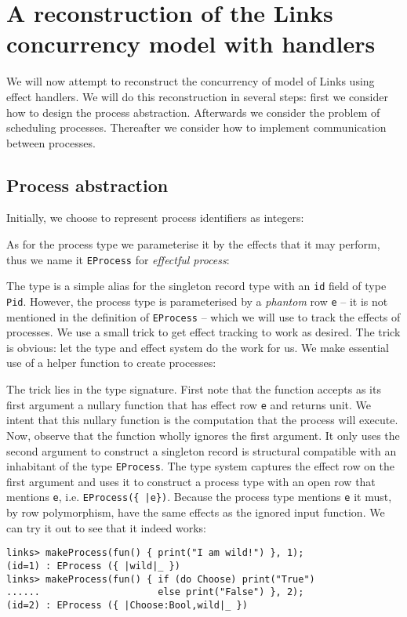 \documentclass[12pt,mscres,cdtppar,twoside,openright,logo,rightchapter,normalheadings]{infthesis}
\newcommand{\snippet}[1]{}
\theoremstyle{definition}
\begin{document}
\section{A reconstruction of the Links concurrency model with handlers}
\label{sec:links-model-handlers}

We will now attempt to reconstruct the concurrency of model of Links
using effect handlers. We will do this reconstruction in several steps:
first we consider how to design the process abstraction. Afterwards we
consider the problem of scheduling processes. Thereafter we consider
how to implement communication between processes.

\subsection{Process abstraction}
\label{sec:links-model-handlers-process}

Initially, we choose to represent process identifiers as integers:
%
\snippet{pidInt.links}
%
As for the process type we parameterise it by the effects that it may
perform, thus we name it \lstinline$EProcess$ for \emph{effectful
  process}:
%
\snippet{eprocess.links}
%
The type is a simple alias for the singleton record type with an
\lstinline$id$ field of type \lstinline$Pid$. However, the process
type is parameterised by a \emph{phantom} row \lstinline$e$ -- it is
not mentioned in the definition of \lstinline$EProcess$ -- which we
will use to track the effects of processes. We use a small trick to
get effect tracking to work as desired. The trick is obvious: let the
type and effect system do the work for us. We make essential use of a
helper function to create processes:
%
\snippet{makeProcess.links}
%
The trick lies in the type signature. First note that the function
accepts as its first argument a nullary function that has effect row
\lstinline$e$ and returns unit. We intent that this nullary function
is the computation that the process will execute. Now, observe that
the function wholly ignores the first argument. It only uses the
second argument to construct a singleton record is structural
compatible with an inhabitant of the type \lstinline$EProcess$. The
type system captures the effect row on the first argument and uses it
to construct a process type with an open row that mentions
\lstinline$e$, i.e. \lstinline$EProcess({ |e})$. Because the process
type mentions \lstinline$e$ it must, by row polymorphism, have the
same effects as the ignored input function. We can try it out to see
that it indeed works:
%
\begin{lstlisting}
links> makeProcess(fun() { print("I am wild!") }, 1);
(id=1) : EProcess ({ |wild|_ })
links> makeProcess(fun() { if (do Choose) print("True") 
......                     else print("False") }, 2);
(id=2) : EProcess ({ |Choose:Bool,wild|_ })
\end{lstlisting}
%
\end{document}
